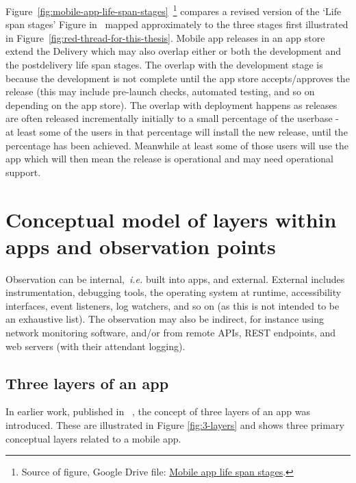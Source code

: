 Figure~\ref{fig:mobile-app-life-span-stages}~\footnote{Source of figure, Google Drive file: \href{https://docs.google.com/document/d/1d4B5l1tlpclHdKwY8W00qchiCV2YK5JjJP8TbkRHcjQ/edit}{Mobile app life span stages}.} compares a revised version of the `Life span stages' Figure in~\citep[p.155]{evans2004_achieving_software_quality_through_teamwork} mapped approximately to the three stages first illustrated in Figure~\ref{fig:red-thread-for-this-thesis}. Mobile app releases in an app store extend the Delivery which may also overlap either or both the development and the postdelivery life span stages. The overlap with the development stage is because the development is not complete until the app store accepts/approves the release (this may include pre-launch checks, automated testing, and so on depending on the app store). The overlap with deployment happens as releases are often released incrementally initially to a small percentage of the userbase - at least some of the users in that percentage will install the new release, until the percentage has been achieved. Meanwhile at least some of those users will use the app which will then mean the release is operational and may need operational support.


\section{Conceptual model of layers within apps and observation points}
Observation can be internal,~\emph{i.e.} built into apps, and external. External includes instrumentation, debugging tools, the operating system at runtime, accessibility interfaces, event listeners, log watchers, and so on (as this is not intended to be an exhaustive list). The observation may also be indirect, for instance using network monitoring software, and/or from remote APIs, REST endpoints, and web servers (with their attendant logging).

\subsection{Three layers of an app}
In earlier work, published in ~\citep{harty_aymer_playbook_2016}, the concept of three layers of an app was introduced. These are illustrated in Figure \ref{fig:3-layers} and shows three primary conceptual layers related to a mobile app. 


